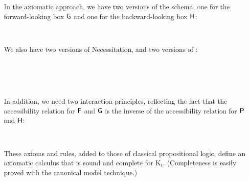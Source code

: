 \begin{minipage}{0.26\textwidth}\centering
{}
  
\vspace{8mm}

\end{minipage}
\bigskip

In the axiomatic approach, we have two versions of the  schema, one for
the forward-looking box $\operatorname{\mathsf{G}}$ and one for the backward-looking box $\operatorname{\mathsf{H}}$:%
%
\begin{principles}
   \\
\end{principles}
%
We also have two versions of Necessitation, and two versions of :
%
\begin{principles}
  \\
  \\
  \\
\end{principles}
%
In addition, we need two interaction principles, reflecting the fact that the
accessibility relation for $\operatorname{\mathsf{F}}$ and $\operatorname{\mathsf{G}}$ is the inverse of the accessibility
relation for $\operatorname{\mathsf{P}}$ and $\operatorname{\mathsf{H}}$:
%
\begin{principles}
\\
\end{principles}

These axioms and rules, added to those of classical propositional logic, define
an axiomatic calculus that is sound and complete for K$_{t}$. (Completeness is
easily proved with the canonical model technique.)

